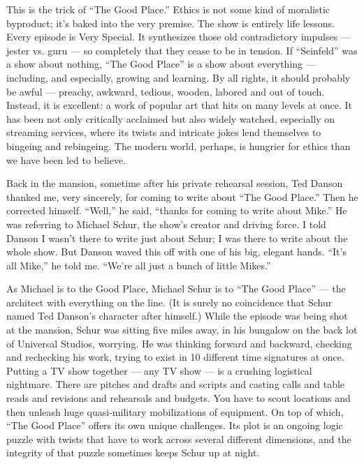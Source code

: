 This is the trick of ``The Good Place.'' Ethics is not some kind of
moralistic byproduct; it's baked into the very premise. The show is
entirely life lessons. Every episode is Very Special. It synthesizes
those old contradictory impulses --- jester vs. guru --- so completely
that they cease to be in tension. If ``Seinfeld'' was a show about
nothing, ``The Good Place'' is a show about everything --- including,
and especially, growing and learning. By all rights, it should probably
be awful --- preachy, awkward, tedious, wooden, labored and out of
touch. Instead, it is excellent: a work of popular art that hits on many
levels at once. It has been not only critically acclaimed but also
widely watched, especially on streaming services, where its twists and
intricate jokes lend themselves to bingeing and rebingeing. The modern
world, perhaps, is hungrier for ethics than we have been led to believe.

Back in the mansion, sometime after his private rehearsal session, Ted
Danson thanked me, very sincerely, for coming to write about ``The Good
Place.'' Then he corrected himself. ``Well,'' he said, ``thanks for
coming to write about Mike.'' He was referring to Michael Schur, the
show's creator and driving force. I told Danson I wasn't there to write
just about Schur; I was there to write about the whole show. But Danson
waved this off with one of his big, elegant hands. ``It's all Mike,'' he
told me. ``We're all just a bunch of little Mikes.''

As Michael is to the Good Place, Michael Schur is to ``The Good Place''
--- the architect with everything on the line. (It is surely no
coincidence that Schur named Ted Danson's character after himself.)
While the episode was being shot at the mansion, Schur was sitting five
miles away, in his bungalow on the back lot of Universal Studios,
worrying. He was thinking forward and backward, checking and rechecking
his work, trying to exist in 10 different time signatures at once.
Putting a TV show together --- any TV show --- is a crushing logistical
nightmare. There are pitches and drafts and scripts and casting calls
and table reads and revisions and rehearsals and budgets. You have to
scout locations and then unleash huge quasi-military mobilizations of
equipment. On top of which, ``The Good Place'' offers its own unique
challenges. Its plot is an ongoing logic puzzle with twists that have to
work across several different dimensions, and the integrity of that
puzzle sometimes keeps Schur up at night.

